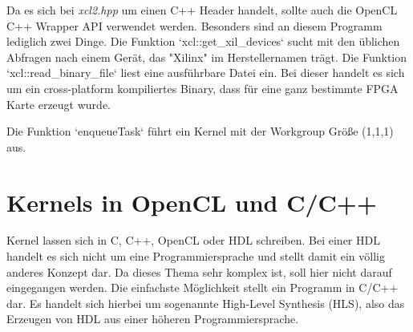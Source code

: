 		Da es sich bei \textit{xcl2.hpp} um einen C++ Header handelt, sollte auch die OpenCL C++ Wrapper \Gls{API} verwendet werden. Besonders sind an diesem Programm lediglich zwei Dinge. Die Funktion \li`xcl::get_xil_devices` sucht mit den üblichen Abfragen nach einem Gerät, das "Xilinx" im Herstellernamen trägt. Die Funktion \li`xcl::read_binary_file` liest eine ausführbare Datei ein. Bei dieser handelt es sich um ein cross-platform kompiliertes Binary, dass für eine ganz bestimmte FPGA Karte erzeugt wurde.
		
		Die Funktion \li`enqueueTask` führt ein \Gls{Kernel} mit der \Gls{Workgroup} Größe (1,1,1) aus.
		
		\section{Kernels in OpenCL und C/C++}
		\Gls{Kernel} lassen sich in C, C++, OpenCL oder HDL schreiben. Bei einer HDL handelt es sich nicht um eine Programmiersprache und stellt damit ein völlig anderes Konzept dar. Da dieses Thema sehr komplex ist, soll hier nicht darauf eingegangen werden. Die einfachste Möglichkeit stellt ein Programm in C/C++ dar. Es handelt sich hierbei um sogenannte High-Level Synthesis (HLS), also das Erzeugen von HDL aus einer höheren Programmiersprache.
